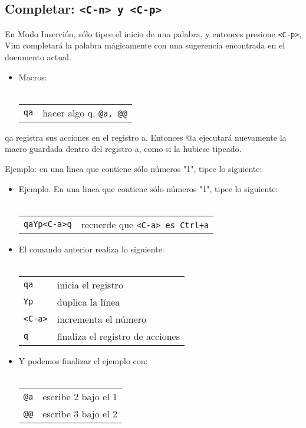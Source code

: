 \subsection{Completar: \texttt{<C-n> y <C-p>}}


En Modo Inserción, sólo tipee el inicio de una palabra,
y entonces presione \texttt{<C-p>}, Vim completará la palabra mágicamente con
una sugerencia encontrada en el documento actual.


\begin{itemize}
	\item Macros: \\ \\ 
\begin{tabular}{ l l }
	\texttt{qa} & hacer algo q, \texttt{@a, @@}
\end{tabular}
\end{itemize}

qa registra sus acciones en el registro a. Entonces @a ejecutará nuevamente
la macro guardada dentro del registro a, como si la hubiese tipeado.

Ejemplo: en una linea que contiene sólo números "1", tipee lo siguiente:

\begin{itemize}
	\item Ejemplo. En una linea que contiene sólo números "1", tipee lo siguiente: \\ \\
\begin{tabular}{ l l }
	\texttt{qaYp<C-a>q} & recuerde que \texttt{<C-a> es Ctrl+a} \\
\end{tabular}
\end{itemize}
\begin{itemize}
	\item El comando anterior realiza lo siguiente: \\ \\
\begin{tabular}{ l l }
            \texttt{qa} & inicia el registro \\
            \texttt{Yp} & duplica la línea \\
            \texttt{<C-a>} & incrementa el número \\
            \texttt{q} & finaliza el registro de acciones \\
\end{tabular}
\end{itemize}
\begin{itemize}
	\item Y podemos finalizar el ejemplo con: \\ \\
\begin{tabular}{ l l }
	\texttt{@a} & escribe 2 bajo el 1 \\
	\texttt{@@} & escribe 3 bajo el 2 \\
\end{tabular}
\end{itemize}

